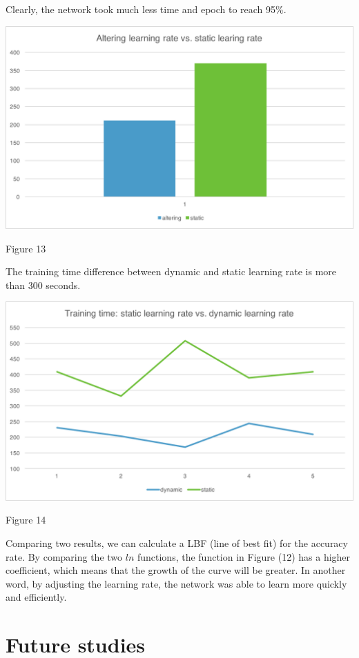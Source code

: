 \documentclass[]{article}
\begin{document}
\begin{multicols}{2}
Clearly, the network took much less time and epoch to reach 95\%. 
\centerline{\includegraphics[width=1\linewidth]{graph10} }
\centerline{Figure 13}
\vspace{0.5cm}

The training time difference between dynamic and static learning rate is more than 300 seconds. 

\centerline{\includegraphics[width=1\linewidth]{graph11} }
\centerline{Figure 14}
\vspace{0.5cm}

Comparing two results, we can calculate a LBF (line of best fit) for the accuracy rate. By comparing the two \(ln\) functions, the function in Figure (12) has a higher coefficient, which means that the growth of the curve will be greater. In another word, by adjusting the learning rate, the network was able to learn more quickly and efficiently. 

\section{Future studies}


\end{multicols}
\end{document}

